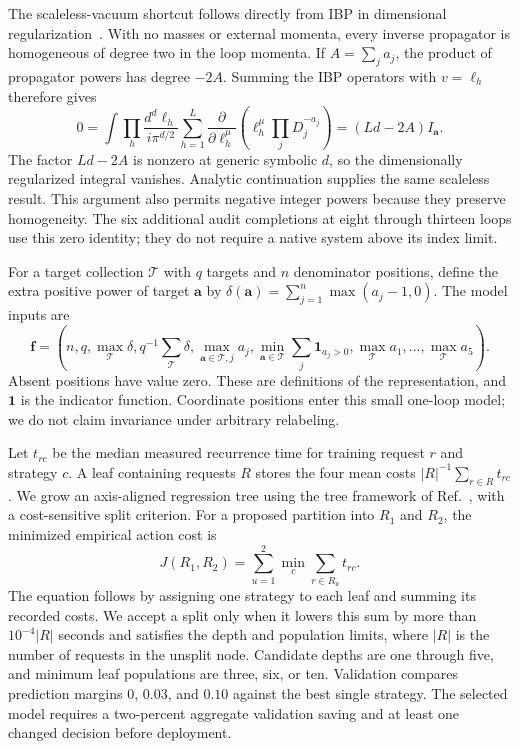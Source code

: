 The scaleless-vacuum shortcut follows directly from IBP in dimensional regularization~\cite{ChetyrkinTkachov,Weinzierl2022}. With no masses or external momenta, every inverse propagator is homogeneous of degree two in the loop momenta. If $A=\sum_j a_j$, the product of propagator powers has degree $-2A$. Summing the IBP operators with $v=\ell_h$ therefore gives
\begin{equation}
 0=\int\prod_h\frac{d^d\ell_h}{i\pi^{d/2}}
 \sum_{h=1}^{L}\frac{\partial}{\partial\ell_h^\mu}
 \left(\ell_h^\mu\prod_j D_j^{-a_j}\right)
 =(Ld-2A)I_{\boldsymbol a}.
 \label{eq:notes-fast-scaleless}
\end{equation}
The factor $Ld-2A$ is nonzero at generic symbolic $d$, so the dimensionally regularized integral vanishes. Analytic continuation supplies the same scaleless result. This argument also permits negative integer powers because they preserve homogeneity. The six additional audit completions at eight through thirteen loops use this zero identity; they do not require a native system above its index limit.

For a target collection $\mathcal T$ with $q$ targets and $n$ denominator positions, define the extra positive power of target $\boldsymbol a$ by $\delta(\boldsymbol a)=\sum_{j=1}^{n}\max(a_j-1,0)$. The model inputs are
\begin{equation}
 \boldsymbol f=\left(n,q,\max_{\mathcal T}\delta,
 q^{-1}\sum_{\mathcal T}\delta,
 \max_{\boldsymbol a\in\mathcal T,j}a_j,
 \min_{\boldsymbol a\in\mathcal T}\sum_j\mathbf1_{a_j>0},
 \max_{\mathcal T}a_1,\ldots,\max_{\mathcal T}a_5\right).
 \label{eq:notes-fast-features}
\end{equation}
Absent positions have value zero. These are definitions of the representation, and $\mathbf1$ is the indicator function. Coordinate positions enter this small one-loop model; we do not claim invariance under arbitrary relabeling.

Let $t_{rc}$ be the median measured recurrence time for training request $r$ and strategy $c$. A leaf containing requests $R$ stores the four mean costs $|R|^{-1}\sum_{r\in R}t_{rc}$. We grow an axis-aligned regression tree using the tree framework of Ref.~\cite{CART1984}, with a cost-sensitive split criterion. For a proposed partition into $R_1$ and $R_2$, the minimized empirical action cost is
\begin{equation}
 J(R_1,R_2)=\sum_{u=1}^{2}\min_c\sum_{r\in R_u}t_{rc}.
 \label{eq:notes-fast-tree-loss}
\end{equation}
The equation follows by assigning one strategy to each leaf and summing its recorded costs. We accept a split only when it lowers this sum by more than $10^{-4}|R|$ seconds and satisfies the depth and population limits, where $|R|$ is the number of requests in the unsplit node. Candidate depths are one through five, and minimum leaf populations are three, six, or ten. Validation compares prediction margins $0$, $0.03$, and $0.10$ against the best single strategy. The selected model requires a two-percent aggregate validation saving and at least one changed decision before deployment.

